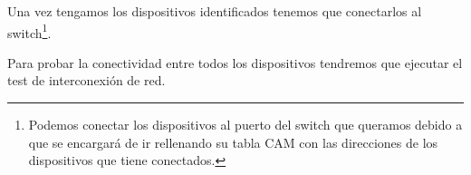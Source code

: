 \documentclass[12pt,letterpaper]{article}
\begin{document}
Una vez tengamos los dispositivos identificados tenemos que conectarlos al switch\footnote{Podemos conectar los dispositivos al puerto del switch que queramos debido a que se encargará de ir rellenando su tabla CAM con las direcciones de los dispositivos que tiene conectados.}.


Para probar la conectividad entre todos los dispositivos tendremos que ejecutar el test de interconexión de red.
\end{document}
